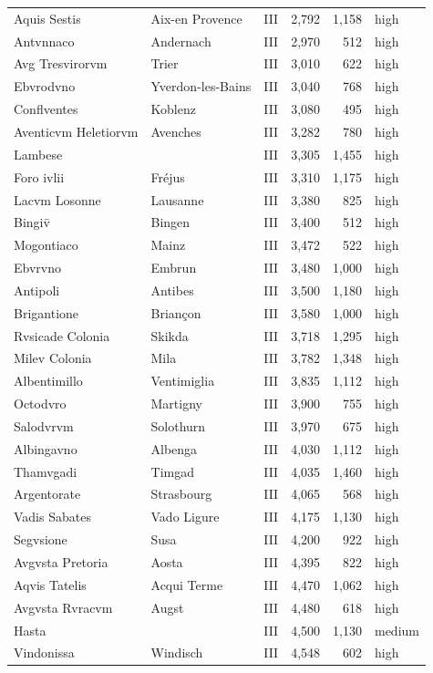 \documentclass[11pt,a4paper]{article}
\begin{document}
{\begin{longtable}{p{4.6cm}p{5.2cm}lrrl}
Aquis Sestis & Aix-en Provence & III & 2,792 & 1,158 & high\\
Antvnnaco & Andernach & III & 2,970 & 512 & high\\
Avg Tresvirorvm & Trier & III & 3,010 & 622 & high\\
Ebvrodvno & Yverdon-les-Bains & III & 3,040 & 768 & high\\
Conflventes & Koblenz & III & 3,080 & 495 & high\\
Aventicvm Heletiorvm & Avenches & III & 3,282 & 780 & high\\
Lambese &  & III & 3,305 & 1,455 & high\\
Foro ivlii & Fréjus & III & 3,310 & 1,175 & high\\
Lacvm Losonne & Lausanne & III & 3,380 & 825 & high\\
Bingiv̄ & Bingen & III & 3,400 & 512 & high\\
Mogontiaco & Mainz & III & 3,472 & 522 & high\\
Ebvrvno & Embrun & III & 3,480 & 1,000 & high\\
Antipoli & Antibes & III & 3,500 & 1,180 & high\\
Brigantione & Briançon & III & 3,580 & 1,000 & high\\
Rvsicade Colonia & Skikda & III & 3,718 & 1,295 & high\\
Milev Colonia & Mila & III & 3,782 & 1,348 & high\\
Albentimillo & Ventimiglia & III & 3,835 & 1,112 & high\\
Octodvro & Martigny & III & 3,900 & 755 & high\\
Salodvrvm & Solothurn & III & 3,970 & 675 & high\\
Albingavno & Albenga & III & 4,030 & 1,112 & high\\
Thamvgadi & Timgad & III & 4,035 & 1,460 & high\\
Argentorate & Strasbourg & III & 4,065 & 568 & high\\
Vadis Sabates & Vado Ligure & III & 4,175 & 1,130 & high\\
Segvsione & Susa & III & 4,200 & 922 & high\\
Avgvsta Pretoria & Aosta & III & 4,395 & 822 & high\\
Aqvis Tatelis & Acqui Terme & III & 4,470 & 1,062 & high\\
Avgvsta Rvracvm & Augst & III & 4,480 & 618 & high\\
Hasta &  & III & 4,500 & 1,130 & medium\\
Vindonissa & Windisch & III & 4,548 & 602 & high\\

\end{longtable}}
\end{document}
